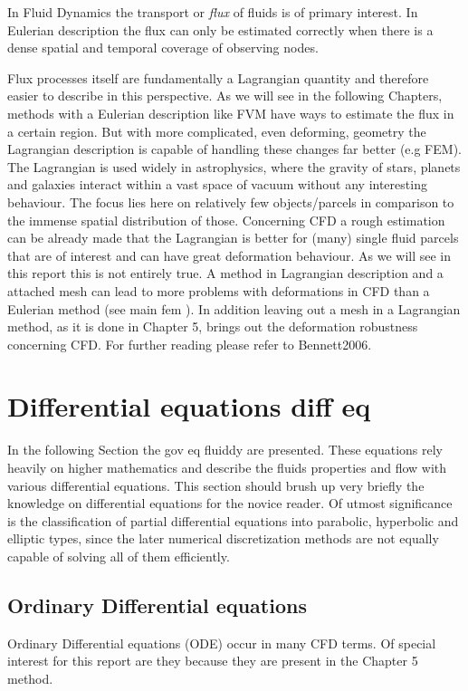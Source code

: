 In Fluid Dynamics the transport or \emph{flux} of fluids is of primary interest. In Eulerian description the flux can only be estimated correctly when there is a dense spatial and temporal coverage of observing nodes.

Flux processes itself are fundamentally a Lagrangian quantity and therefore easier to describe in this perspective. As we will see in the following Chapters, methods with a Eulerian description like FVM have ways to estimate the flux in a certain region. But with more complicated, even deforming, geometry the Lagrangian description is capable of handling these changes far better (e.g FEM). The Lagrangian is used widely in astrophysics, where the gravity of stars, planets and galaxies interact within a vast space of vacuum without any interesting behaviour. The focus lies here on relatively few objects/parcels in comparison to the immense
spatial distribution of those. Concerning CFD a rough estimation can be already made that the Lagrangian is better for (many) single fluid parcels that are of interest and can have great deformation behaviour. As we will see in this report this is not entirely true. A method in Lagrangian description and a attached mesh can lead to more problems with deformations in CFD than a Eulerian method (see main fem ). In addition
leaving out a mesh in a Lagrangian method, as it is done in Chapter 5, brings out the deformation robustness concerning CFD. For further reading please refer to Bennett2006.

\section{Differential equations diff eq}
In the following Section the gov eq fluiddy are presented. These equations rely heavily on
higher mathematics and describe the fluids properties and flow with various differential equations. This section should brush up very briefly the knowledge on differential equations for the novice reader. Of utmost significance is the classification of partial differential equations into parabolic, hyperbolic and elliptic types, since the later numerical discretization methods are not equally capable of solving all of them efficiently.
\subsection{Ordinary Differential equations}
Ordinary Differential equations (ODE) occur in many CFD terms. Of special interest for this report are they because they are present in the Chapter 5 method.

